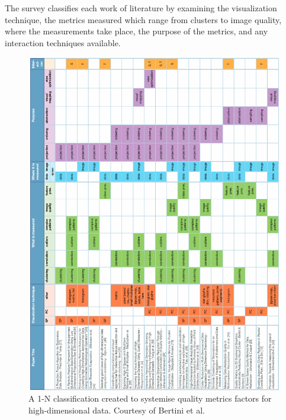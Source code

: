 The survey classifies each work of literature by examining the visualization technique, the metrics measured which range from clusters to image quality, where the measurements take place, the purpose of the metrics, and any interaction techniques available.

\begin{figure}[p]
\begin{center}
\includegraphics[width=1\textwidth]{images/bertini2011quality}
\caption{A 1-N classification created to systemise quality metrics factors for high-dimensional data. Courtesy of Bertini et al.\ \cite{bertini2011quality}} \label{fig: bertini2011quality}
\end{center}
\end{figure}

